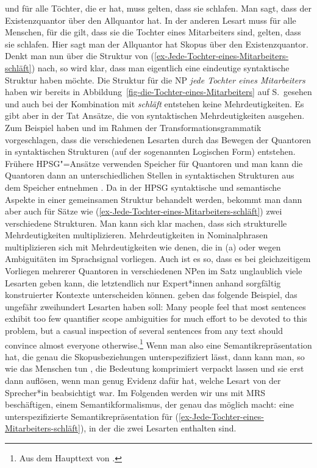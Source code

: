 und für alle Töchter, die er hat, muss gelten, dass sie schlafen. Man sagt, dass der Existenzquantor
 über den Allquantor hat. In der anderen Lesart muss für alle
Menschen, für die gilt, dass sie die Tochter eines Mitarbeiters sind, gelten, dass sie
schlafen. Hier sagt man der Allquantor hat Skopus über den Existenzquantor. Denkt man nun über die
Struktur von (\ref{ex-Jede-Tochter-eines-Mitarbeiters-schläft}) nach, so wird klar, dass man eigentlich eine eindeutige syntaktische
Struktur haben möchte. Die Struktur für die NP \emph{jede Tochter eines Mitarbeiters} haben wir
bereits in Abbildung~\ref{fig-die-Tochter-eines-Mitarbeiters} auf
S.\,\pageref{fig-die-Tochter-eines-Mitarbeiters} gesehen und auch bei der Kombination mit
\emph{schläft} entstehen keine Mehrdeutigkeiten. Es gibt aber in der Tat Ansätze, die
von syntaktischen Mehrdeutigkeiten ausgehen. Zum Beispiel haben \citet{Chomsky76a-u} und
\citet{May77a-u,May85a-u} im Rahmen der Transformationsgrammatik \citep{Chomsky57a,Chomsky81a} vorgeschlagen, dass die verschiedenen Lesarten durch das Bewegen der Quantoren in
syntaktischen Strukturen (auf der sogenannten Logischen Form) entstehen. Frühere HPSG"=Ansätze
verwenden Speicher für Quantoren und man kann die Quantoren dann an unterschiedlichen Stellen in
syntaktischen Strukturen aus dem Speicher entnehmen \parencites{Cooper83}[Kapitel~8]{ps2}. Da in der
HPSG syntaktische und semantische Aspekte in einer gemeinsamen Struktur behandelt werden, bekommt
man dann aber auch für Sätze wie (\ref{ex-Jede-Tochter-eines-Mitarbeiters-schläft}) zwei verschiedene Strukturen. Man kann sich klar machen, dass sich strukturelle
Mehrdeutigkeiten multiplizieren. Mehrdeutigkeiten in Nominalphrasen multiplizieren sich mit
Mehrdeutigkeiten wie denen, die in (a) oder wegen Ambiguitäten im Sprachsignal vorliegen. Auch ist es so, dass es bei gleichzeitigem
Vorliegen mehrerer Quantoren in verschiedenen NPen im Satz unglaublich viele Lesarten geben kann, die
letztendlich nur Expert*innen anhand sorgfältig konstruierter Kontexte unterscheiden
können. 
\citet[]{ADKMNT2003a} geben das folgende Beispiel, das ungefähr zweihundert Lesarten haben soll:
\ea
Many people feel that most sentences exhibit too few quantifier scope ambiguities for much effort to be devoted
to this problem, but a casual inspection of several sentences from any text should convince almost everyone
otherwise.\footnote{%
  Aus dem Haupttext von .
}
\z
Wenn
man also eine Semantikrepräsentation hat, die genau die Skopusbeziehungen unterspezifiziert lässt, dann kann
man, so wie das Menschen tun \citep{FBF2002a-u,Dwivedi2013a-u,Frances2024a-u}, 
die Bedeutung komprimiert verpackt lassen und sie erst dann
auflösen, wenn man genug Evidenz dafür hat, welche Lesart von der Sprecher*in beabsichtigt war.
Im Folgenden werden wir uns mit MRS beschäftigen, einem Semantikformalismus, der genau das möglich
macht: eine unterspezifizierte Semantikrepräsentation für (\ref{ex-Jede-Tochter-eines-Mitarbeiters-schläft}), in der die zwei Lesarten
enthalten sind.

